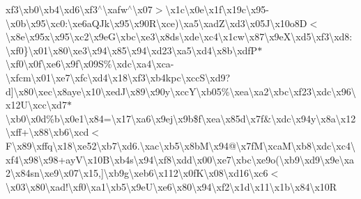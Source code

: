 xf3\textbackslash{}xb0\textbackslash{}xb4\textbackslash{}xd6\textbackslash{}xf3$^\wedge$\textbackslash{}xafw$^\wedge$\textbackslash{}x07$>$\textbackslash{}x1c\textbackslash{}x0e\textbackslash{}x1f\textbackslash{}x19c\textbackslash{}x95-\/\textbackslash{}x0b\textbackslash{}x95\textbackslash{}xc0\+:\textbackslash{}xe6a\+Q\+Jk\textbackslash{}x95\textbackslash{}x90\+R\textbackslash{}xce)\textbackslash{}xa5\textbackslash{}xad\+Z\textbackslash{}xd3\textbackslash{}x05\+J\textbackslash{}x10o8\+D$<$\textbackslash{}x8e\textbackslash{}x95x\textbackslash{}x95\textquotesingle{}\textbackslash{}xc2\textbackslash{}x9e\+G\textbackslash{}xbc\textbackslash{}xe3\textbackslash{}x8ds\textbackslash{}xde\textbackslash{}xc4\textbackslash{}x1cw\textbackslash{}x87\textbackslash{}x9e\+X\textbackslash{}xd5\textbackslash{}xf3\textbackslash{}xd8\+:\textbackslash{}xf0\}\textbackslash{}x01\textbackslash{}x80\textbackslash{}xe3\textbackslash{}x94\textbackslash{}x85\textbackslash{}x94\textbackslash{}xd23\textbackslash{}xa5\textbackslash{}xd4\textbackslash{}x8b\textbackslash{}xdf\+P$\ast$\textbackslash{}xf0\textbackslash{}x0f\textbackslash{}xe6\textbackslash{}x9f\textbackslash{}x09\+S\%\textbackslash{}xdc\textbackslash{}xa4\textbackslash{}xca-\/\textbackslash{}xfcm\textbackslash{}x01\textbackslash{}xe7\textbackslash{}xfc\textbackslash{}xd4\textbackslash{}x18\textbackslash{}xf3\textbackslash{}xb4kpc\textbackslash{}xcc\+S\textbackslash{}xd9?d\mbox{]}\textbackslash{}x80\textbackslash{}xec\textbackslash{}x8aye\textbackslash{}x10\textbackslash{}xed\+J\textbackslash{}x89\textbackslash{}x90y\textbackslash{}xcc\+Y\textbackslash{}xb05\%\textbackslash{}xea\textbackslash{}xa2\textbackslash{}xbc\textbackslash{}xf23\textbackslash{}xdc\textbackslash{}x96\textbackslash{}x12\+U\textbackslash{}xcc\textbackslash{}xd7$\ast$\textbackslash{}xb0\textbackslash{}x0d\%b\textbackslash{}x0e1\textbackslash{}x84=\textbackslash{}x17\textbackslash{}xa6\textbackslash{}x9ej\textbackslash{}x9b\$f\textbackslash{}xea\textbackslash{}x85d\textbackslash{}x7f\&\textbackslash{}xdc\textbackslash{}x94y\textbackslash{}x8a\textbackslash{}x12\textbackslash{}xff+\textbackslash{}x88\textbackslash{}xb6\textbackslash{}xcd$<$\+F\textbackslash{}x89\textbackslash{}xffq\textbackslash{}x18\textbackslash{}xe52\textbackslash{}xb7\textbackslash{}xd6.\textbackslash{}xac\textbackslash{}xb5\textbackslash{}x8b\+M\textbackslash{}x94@\textbackslash{}x7f\+M\textbackslash{}xca\+M\textbackslash{}xb8\textbackslash{}xdc\textbackslash{}xc4\textbackslash{}xf4\textbackslash{}x98\textbackslash{}x98+ay\+V\textbackslash{}x10\+B\textbackslash{}xb4s\textbackslash{}x94\textbackslash{}xf8\textbackslash{}xdd\textbackslash{}x00\textbackslash{}xe7\textbackslash{}xbc\textbackslash{}xe9o(\textbackslash{}xb9\textbackslash{}xd9\textbackslash{}x9e\textbackslash{}xa2\textbackslash{}x84sn\textbackslash{}xe9\textbackslash{}x07\textbackslash{}x15,\mbox{]}\textbackslash{}xb9g\textbackslash{}xeb6\textbackslash{}x112\textbackslash{}x0f\+K\textbackslash{}x08\textbackslash{}xd16\textbackslash{}xc6$<$\textbackslash{}x03\textbackslash{}x80\textbackslash{}xad!\textbackslash{}xf0\textbackslash{}xa1\textbackslash{}xb5\textbackslash{}x9e\+U\textbackslash{}xe6\textbackslash{}x80\textbackslash{}x94\textbackslash{}xf2\textbackslash{}x1d\textbackslash{}x11\textbackslash{}x1b\textbackslash{}x84\textbackslash{}x10\+R